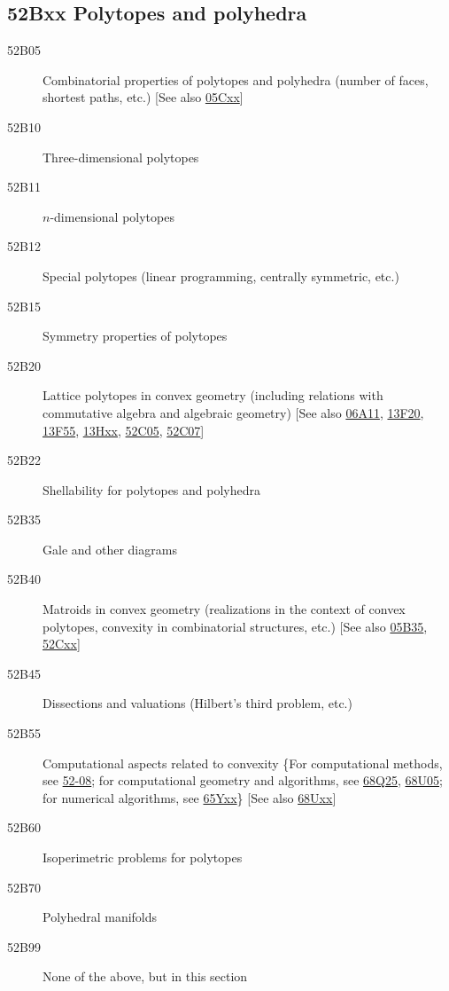 \subsection*{52Bxx  Polytopes and polyhedra }\label{52Bxx}
\begin{description}  
\item [52B05]\label{52B05} Combinatorial properties of polytopes and polyhedra (number of faces, shortest paths, etc.) [See also \hyperref[05Cxx]{05Cxx}]
\item [52B10]\label{52B10} Three-dimensional polytopes
\item [52B11]\label{52B11} $n$-dimensional polytopes
\item [52B12]\label{52B12} Special polytopes (linear programming, centrally symmetric, etc.)
\item [52B15]\label{52B15} Symmetry properties of polytopes
\item [52B20]\label{52B20} Lattice polytopes in convex geometry (including relations with commutative algebra and algebraic geometry) [See also \hyperref[06A11]{06A11}, \hyperref[13F20]{13F20}, \hyperref[13F55]{13F55}, \hyperref[13Hxx]{13Hxx}, \hyperref[52C05]{52C05}, \hyperref[52C07]{52C07}]
\item [52B22]\label{52B22} Shellability for polytopes and polyhedra
\item [52B35]\label{52B35} Gale and other diagrams
\item [52B40]\label{52B40} Matroids in convex geometry (realizations in the context of convex polytopes, convexity in combinatorial structures, etc.) [See also \hyperref[05B35]{05B35}, \hyperref[52Cxx]{52Cxx}]
\item [52B45]\label{52B45} Dissections and valuations (Hilbert's third problem, etc.)
\item [52B55]\label{52B55} Computational aspects related to convexity \{For computational methods, see \hyperref[52-08]{52-08}; for computational geometry and algorithms, see \hyperref[68Q25]{68Q25}, \hyperref[68U05]{68U05}; for numerical algorithms, see \hyperref[65Yxx]{65Yxx}\} [See also \hyperref[68Uxx]{68Uxx}]
\item [52B60]\label{52B60} Isoperimetric problems for polytopes
\item [52B70]\label{52B70} Polyhedral manifolds
\item [52B99]\label{52B99} None of the above, but in this section
\end{description}
